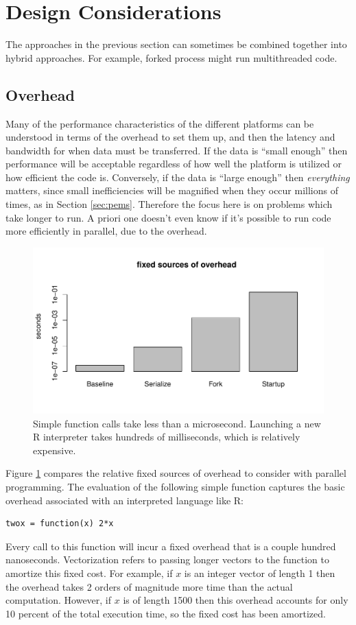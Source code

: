 \documentclass[12pt]{article}
\begin{document}
\section{Design Considerations}

The approaches in the previous section can sometimes be combined together
into hybrid approaches. For example, forked process might run multithreaded
code.

\subsection{Overhead}

Many of the performance characteristics of the different platforms can be
understood in terms of the overhead to set them up, and then the latency
and bandwidth for when data must be transferred.  If the data is ``small
enough'' then performance will be acceptable regardless of how well the
platform is utilized or how efficient the code is. Conversely, if the data
is ``large enough'' then \emph{everything} matters, since small
inefficiencies will be magnified when they occur millions of times, as in
Section \ref{sec:pems}.  Therefore the focus here is on problems which take longer
to run. A priori one doesn't even know if it's possible to run code more
efficiently in parallel, due to the overhead.

\begin{figure}
\centering
\includegraphics[width=.8\linewidth]{compute_times/overhead}
\caption{Simple function calls take less than a microsecond. Launching a
    new R interpreter takes hundreds of milliseconds, which is relatively expensive.}
\label{fig:overhead}
\end{figure}

Figure \ref{fig:overhead} compares the relative fixed sources of overhead to
consider with parallel programming. The evaluation of the following simple
function captures the basic overhead associated with an interpreted
language like R:
\begin{verbatim}
twox = function(x) 2*x
\end{verbatim}
Every call to this function will incur a fixed overhead that is a couple
hundred nanoseconds. Vectorization refers to passing longer vectors to the
function to amortize this fixed cost. For example, if $x$ is an integer
vector of length 1 then the overhead takes 2 orders of magnitude more time
than the actual computation. However, if $x$ is of length 1500 then this
overhead accounts for only 10 percent of the total execution time, so the
fixed cost has been amortized.
\end{document}
